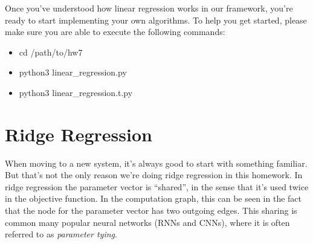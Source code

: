 \documentclass{article}
\theoremstyle{plain}
\theoremstyle{definition}
\begin{document}
Once you've understood how linear regression works in our framework,
you're ready to start implementing your own algorithms. To help you get started, please make sure you are able to execute the following commands:
\begin{itemize}
    \item cd /path/to/hw7
    \item python3 linear\_regression.py
    \item python3 linear\_regression.t.py
\end{itemize}

\section{Ridge Regression}

When moving to a new system, it's always good to start with something
familiar. But that's not the only reason we're doing ridge regression
in this homework. In ridge regression the
parameter vector is ``shared'', in the sense that it's used twice
in the objective function. In the computation graph, this can be seen
in the fact that the node for the parameter vector has two outgoing
edges. 
This sharing is common many popular neural networks (RNNs and CNNs), where it is often referred to as \emph{parameter tying}.
\end{document}

